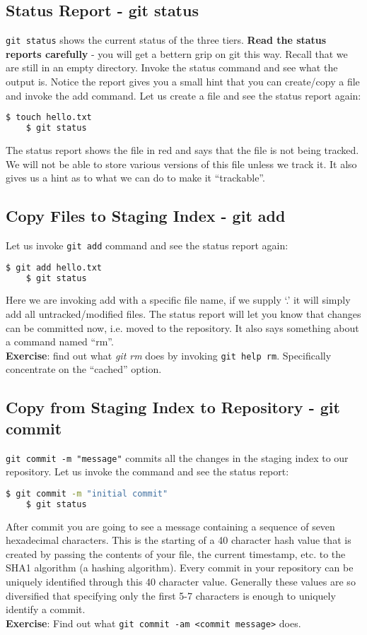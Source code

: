 \documentclass{article}
\begin{document}
\subsection{Status Report - git status}
\verb|git status| shows the current status of the three tiers.
\textbf{Read the status reports carefully} - you will get a bettern grip on git this way.
Recall that we are still in an empty directory.
Invoke the status command and see what the output is.
Notice the report gives you a small hint that you can create/copy a file and invoke the add command.
Let us create a file and see the status report again:
\begin{lstlisting}[language=bash]
	$ touch hello.txt
	$ git status
\end{lstlisting}
The status report shows the file in red and says that the file is not being tracked.
We will not be able to store various versions of this file unless we track it.
It also gives us a hint as to what we can do to make it ``trackable''.

\subsection{Copy Files to Staging Index - git add}
Let us invoke \verb|git add| command and see the status report again:
\begin{lstlisting}[language=bash]
	$ git add hello.txt
	$ git status
\end{lstlisting}
Here we are invoking add with a specific file name, if we supply `.' it will simply add all untracked/modified files.
The status report will let you know that changes can be committed now, i.e. moved to the repository.
It also says something about a command named ``rm''.\\ \textbf{Exercise}: find out what \textit{git rm} does by
invoking \verb|git help rm|. Specifically concentrate on the ``cached'' option.

\subsection{Copy from Staging Index to Repository - git commit}
\verb|git commit -m "message"| commits all the changes in the staging index to our repository.
Let us invoke the command and see the status report:
\begin{lstlisting}[language=bash]
	$ git commit -m "initial commit"
	$ git status
\end{lstlisting}
After commit you are going to see a message containing a sequence of seven hexadecimal characters.
This is the starting of a 40 character hash value that is created by passing the contents of your file, the current timestamp, etc.
to the SHA1 algorithm (a hashing algorithm).
Every commit in your repository can be uniquely identified through this 40 character value.
Generally these values are so diversified that specifying only the first 5-7 characters is enough to uniquely identify a commit.
\\\textbf{Exercise}: Find out what \verb|git commit -am <commit message>| does.
\end{document}
